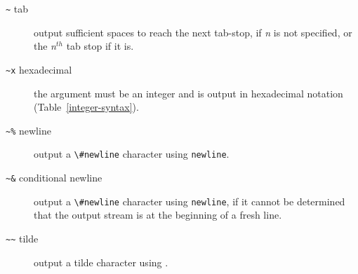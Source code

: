 \begin{optDefinition}
\begin{description}
    \item[{\tt\textasciitilde}\true\/ tab]%
    output sufficient spaces to reach the next tab-stop, if {\em n\/} is not
    specified, or the {\em n$^{th}$} tab stop if it is.

    \item[{\tt\textasciitilde x} hexadecimal]%
    the argument must be an integer and is output in hexadecimal notation
    (Table~\ref{integer-syntax}).

    \item[{\tt\textasciitilde \%} newline]%
    output a \verb+\#newline+ character using {\tt newline}.

    \item[{\tt\textasciitilde \&} conditional newline]%
    output a \verb+\#newline+ character using {\tt newline}, if it cannot be
    determined that the output stream is at the beginning of a fresh line.

    \item[{\tt\textasciitilde \textasciitilde} tilde]%
    output a tilde character using .
\end{description}
%
\end{optDefinition}
